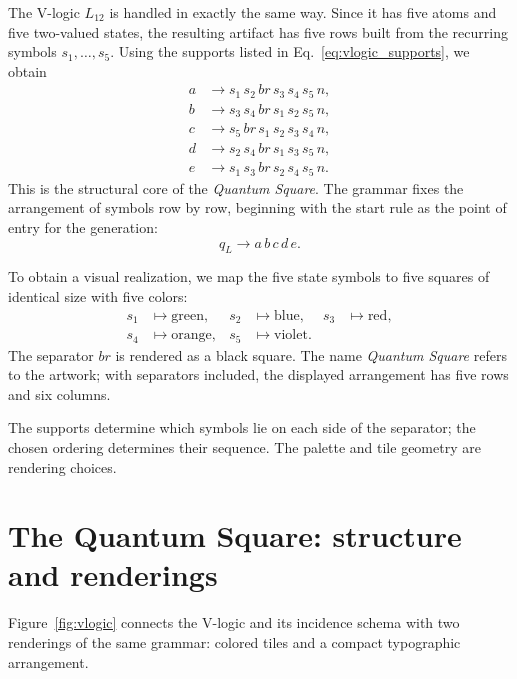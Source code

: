 \documentclass[
  10pt,
  twocolumn,
  aps,
  pra,
  showkeys,
  amsmath,amssymb,
  longbibliography
]{revtex4-2}
\begin{document}
The V-logic \(L_{12}\) is handled in exactly the same way. Since it has five atoms and five two-valued states, the resulting artifact has five rows built from the recurring symbols \(s_1,\dots,s_5\). Using the supports listed in Eq.~\eqref{eq:vlogic_supports}, we obtain
\begin{align}
a &\to s_1\,s_2\,br\,s_3\,s_4\,s_5\,n,
\nonumber\\
b &\to s_3\,s_4\,br\,s_1\,s_2\,s_5\,n,
\nonumber\\
c &\to s_5\,br\,s_1\,s_2\,s_3\,s_4\,n,
\nonumber\\
d &\to s_2\,s_4\,br\,s_1\,s_3\,s_5\,n,
\nonumber\\
e &\to s_1\,s_3\,br\,s_2\,s_4\,s_5\,n.
\label{eq:vgrammar}
\end{align}
This is the structural core of the \emph{Quantum Square}. The grammar fixes the arrangement of symbols row by row, beginning with the start rule as the point of entry for the generation:
\begin{equation}
q_L \to a\,b\,c\,d\,e.
\end{equation}

To obtain a visual realization, we map the five state symbols to five squares of identical size with five colors:
\begin{align}
s_1 &\mapsto \text{green},
&
s_2 &\mapsto \text{blue},
&
s_3 &\mapsto \text{red},
\nonumber\\
s_4 &\mapsto \text{orange},
&
s_5 &\mapsto \text{violet}.
\label{eq:vpalette}
\end{align}
The separator \(br\) is rendered as a black square. The name \emph{Quantum Square} refers to the artwork; with separators included, the displayed arrangement has five rows and six columns.

The supports determine which symbols lie on each side of the separator; the chosen ordering determines their sequence. The palette and tile geometry are rendering choices.



\section{The Quantum Square: structure and renderings}

Figure~\ref{fig:vlogic} connects the V-logic and its incidence schema with two renderings of the same grammar: colored tiles and a compact typographic arrangement.
\end{document}
